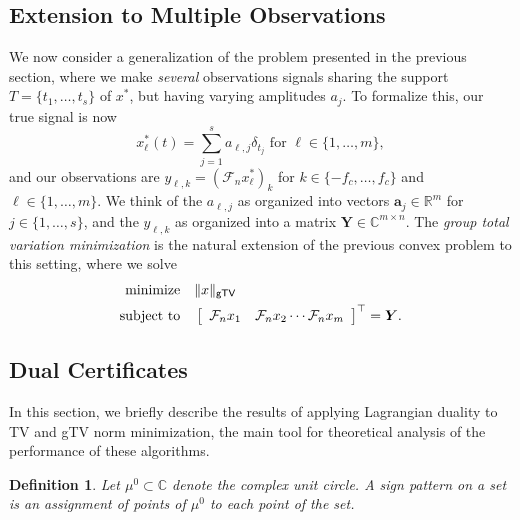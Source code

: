 \documentclass[11pt]{article}
\newcommand{\RR}{\mathbb{R}}
\newcommand{\CC}{\mathbb{C}}
\newcommand{\sF}{\mathcal{F}}
\newcommand{\HS}{\hspace{3.5mm}}
\newcommand{\bY}{\bm Y}
\newcommand{\ba}{\bm a}
\newtheorem{definition}{Definition}
\begin{document}
\subsection{Extension to Multiple Observations}

We now consider a generalization of the problem presented in the previous section, where we make \emph{several} observations signals sharing the support $T = \{t_1, \dots, t_s\}$ of $x^*$, but having varying amplitudes $a_j$.
To formalize this, our true signal is now
\begin{equation}
    x^*_\ell(t) = \sum_{j = 1}^s a_{\ell, j} \delta_{t_j} \text{ for } \ell \in \{1, \dots, m\},
\end{equation}
and our observations are $y_{\ell, k} = (\sF_n x^*_\ell)_{k}$ for $k \in \{-f_c, \dots, f_c\}$ and $\ell \in \{1, \dots, m\}$.
We think of the $a_{\ell, j}$ as organized into vectors $\ba_{j} \in \RR^m$ for $j \in \{1, \dots, s\}$, and the  $y_{\ell, k}$ as organized into a matrix $\bY \in \CC^{m \times n}$.
The \emph{group total variation minimization} is the natural extension of the previous convex problem to this setting, where we solve
\begin{align}
  \text{minimize} &\HS \|x\|_{\mathsf{gTV}} \\
  \text{subject to} &\HS \left[\begin{array}{cccc}\sF_nx_1 & \sF_n x_2 \cdots \sF_n x_m \end{array}\right]^\top = \bY.
\end{align}

\subsection{Dual Certificates}

In this section, we briefly describe the results of applying Lagrangian duality to \textsf{TV} and \textsf{gTV} norm minimization, the main tool for theoretical analysis of the performance of these algorithms.

\begin{definition}
    Let $\mu^0 \subset \CC$ denote the complex unit circle.
    A \emph{sign pattern} on a set is an assignment of points of $\mu^0$ to each point of the set.
\end{definition}
\end{document}
